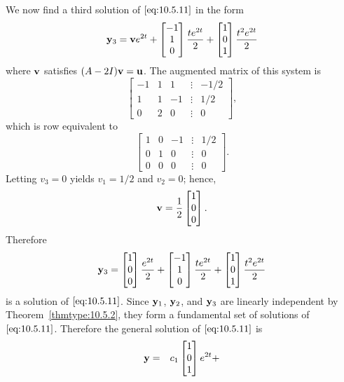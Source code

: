 \documentclass{ximera}
\begin{document}
\begin{example}
\begin{explanation}
We  now find a third solution of  $\eqref{eq:10.5.11}$  in the form
$$
{\bf y}_3={\bf
v}e^{2t}+\begin{bmatrix}-1\\1\\0\end{bmatrix}\frac{te^{2t}}{2}+\begin{bmatrix}1\\0\\1\end{bmatrix}\frac{t^2e^{2t}}{2}
$$
where ${\bf v}$ satisfies $(A-2I){\bf v}={\bf u}$.
The  augmented matrix  of this system is
$$
\begin{bmatrix} -1 & 1 & 1 &\vdots &-1/2\\
1& 1 & -1 &\vdots & 1/2\\ 0 & 2 & 0 &
\vdots & 0\end{bmatrix}, $$
which is row equivalent to
$$
\begin{bmatrix} 1 & 0 &- 1 &\vdots& 1/2\\ 0 & 1 & 0
&\vdots& 0\\ 0 & 0 & 0 &\vdots&0\end{bmatrix}.
$$
Letting $v_3=0$ yields $v_1=1/2$ and $v_2=0$; hence,
$$
{\bf v}=\frac{1}{2}\begin{bmatrix}1\\0\\0\end{bmatrix}.
$$
Therefore
$$
{\bf y}_3=\begin{bmatrix}1\\0\\0\end{bmatrix}\frac{e^{2t}}{2}+
\begin{bmatrix}-1\\1\\0\end{bmatrix}\frac{te^{2t}}{2}+\begin{bmatrix}1\\0\\1\end{bmatrix}\frac{t^2e^{2t}}{2}
$$
is a solution of  $\eqref{eq:10.5.11}$. Since ${\bf y}_1$, ${\bf y}_2$, and
${\bf y}_3$ are linearly independent by Theorem~\ref{thmtype:10.5.2}, they
form a fundamental set of solutions of $\eqref{eq:10.5.11}$. Therefore the
general solution of $\eqref{eq:10.5.11}$ is
\begin{eqnarray*}
{\bf y} &=&c_1\begin{bmatrix}1\\0\\1\end{bmatrix}e^{2t}+

\end{eqnarray*}
\end{explanation}
\end{example}
\end{document}
